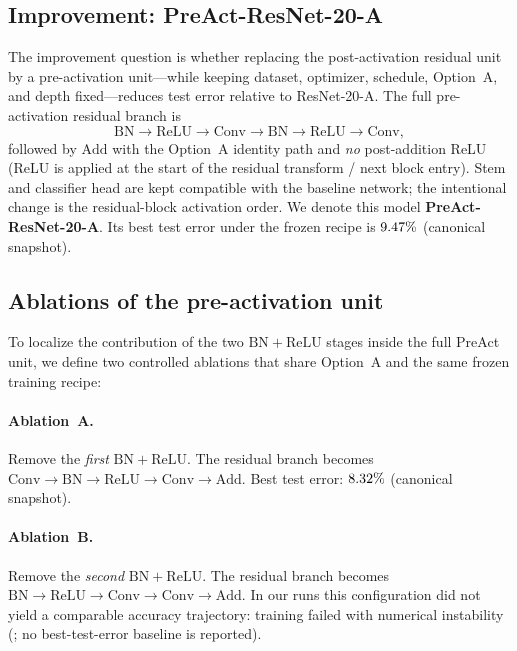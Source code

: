 \subsection{Improvement: PreAct-ResNet-20-A}
\label{sec:method-preact}

The improvement question is whether replacing the post-activation residual unit by a
pre-activation unit---while keeping dataset, optimizer, schedule, Option~A, and depth fixed---reduces
test error relative to ResNet-20-A.
The full pre-activation residual branch is
\[
\mathrm{BN}{\rightarrow}\mathrm{ReLU}{\rightarrow}\mathrm{Conv}{\rightarrow}\mathrm{BN}{\rightarrow}\mathrm{ReLU}{\rightarrow}\mathrm{Conv},
\]
followed by $\mathrm{Add}$ with the Option~A identity path and \emph{no} post-addition ReLU
(ReLU is applied at the start of the residual transform / next block entry).
Stem and classifier head are kept compatible with the baseline network; the intentional change is
the residual-block activation order.
We denote this model \textbf{PreAct-ResNet-20-A}.
Its best test error under the frozen recipe is $9.47\%$
(canonical snapshot).

\subsection{Ablations of the pre-activation unit}
\label{sec:method-ablations}

To localize the contribution of the two $\mathrm{BN}{+}\mathrm{ReLU}$ stages inside the full PreAct unit,
we define two controlled ablations that share Option~A and the same frozen training recipe:

\paragraph{Ablation~A.}
Remove the \emph{first} $\mathrm{BN}{+}\mathrm{ReLU}$.
The residual branch becomes
$\mathrm{Conv}{\rightarrow}\mathrm{BN}{\rightarrow}\mathrm{ReLU}{\rightarrow}\mathrm{Conv}{\rightarrow}\mathrm{Add}$.
Best test error: $8.32\%$ (canonical snapshot).

\paragraph{Ablation~B.}
Remove the \emph{second} $\mathrm{BN}{+}\mathrm{ReLU}$.
The residual branch becomes
$\mathrm{BN}{\rightarrow}\mathrm{ReLU}{\rightarrow}\mathrm{Conv}{\rightarrow}\mathrm{Conv}{\rightarrow}\mathrm{Add}$.
In our runs this configuration did not yield a comparable accuracy trajectory:
training failed with numerical instability (\AblationBStatus; no best-test-error baseline is reported).

